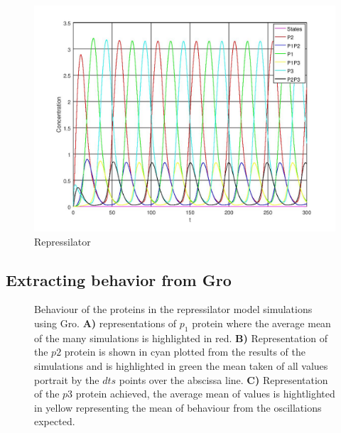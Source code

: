 \documentclass[12pt]{article}
\begin{document}
\begin{figure}[ht]
\centering
\includegraphics[width=.5\textwidth]{repressilator.jpg}
\caption{Repressilator}
\label{fig:repressilator}
\end{figure}

\subsection{Extracting behavior from Gro}

\begin{center}
    \begin{figure}[h]
        
        
        
    
        Behaviour of the proteins in the repressilator model simulations using Gro. \textbf{A)} representations of $p_{1}$ protein where the average mean of the many simulations is highlighted in red. \textbf{B)} Representation of the $p2$ protein is shown in cyan plotted from the results of the simulations and is highlighted in green the mean taken of all values portrait by the $dts$ points over the abscissa line. \textbf{C)} Representation of the $p3$ protein achieved, the average mean of values is hightlighted in yellow representing the mean of behaviour from the oscillations expected.
    \end{figure}
\end{center}
\end{document}
